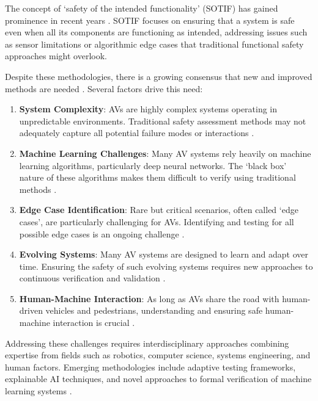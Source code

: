 The concept of `safety of the intended functionality' (SOTIF) has gained prominence in recent years \cite{ISO21448}. SOTIF focuses on ensuring that a system is safe even when all its components are functioning as intended, addressing issues such as sensor limitations or algorithmic edge cases that traditional functional safety approaches might overlook.

Despite these methodologies, there is a growing consensus that new and improved methods are needed \cite{Koopman2019}. Several factors drive this need:

\begin{enumerate}
    \item \textbf{System Complexity}: AVs are highly complex systems operating in unpredictable environments. Traditional safety assessment methods may not adequately capture all potential failure modes or interactions \cite{Burton2017}.
    
    \item \textbf{Machine Learning Challenges}: Many AV systems rely heavily on machine learning algorithms, particularly deep neural networks. The `black box' nature of these algorithms makes them difficult to verify using traditional methods \cite{Salay2019}.
    
    \item \textbf{Edge Case Identification}: Rare but critical scenarios, often called `edge cases', are particularly challenging for AVs. Identifying and testing for all possible edge cases is an ongoing challenge \cite{Koopman2016}.
    
    \item \textbf{Evolving Systems}: Many AV systems are designed to learn and adapt over time. Ensuring the safety of such evolving systems requires new approaches to continuous verification and validation \cite{Seshia2016}.
    
    \item \textbf{Human-Machine Interaction}: As long as AVs share the road with human-driven vehicles and pedestrians, understanding and ensuring safe human-machine interaction is crucial \cite{Vinkhuyzen2018}.
\end{enumerate}

Addressing these challenges requires interdisciplinary approaches combining expertise from fields such as robotics, computer science, systems engineering, and human factors. Emerging methodologies include adaptive testing frameworks, explainable AI techniques, and novel approaches to formal verification of machine learning systems \cite{Seshia2016}.

